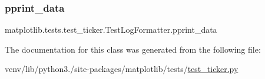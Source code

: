 \subsubsection{\texorpdfstring{pprint\+\_\+data}{pprint\_data}}
{\footnotesize\ttfamily matplotlib.\+tests.\+test\+\_\+ticker.\+Test\+Log\+Formatter.\+pprint\+\_\+data\hspace{0.3cm}{\ttfamily [static]}}



The documentation for this class was generated from the following file\+:\begin{DoxyCompactItemize}
\item 
venv/lib/python3./site-\/packages/matplotlib/tests/\hyperlink{test__ticker_8py}{test\+\_\+ticker.\+py}\end{DoxyCompactItemize}
